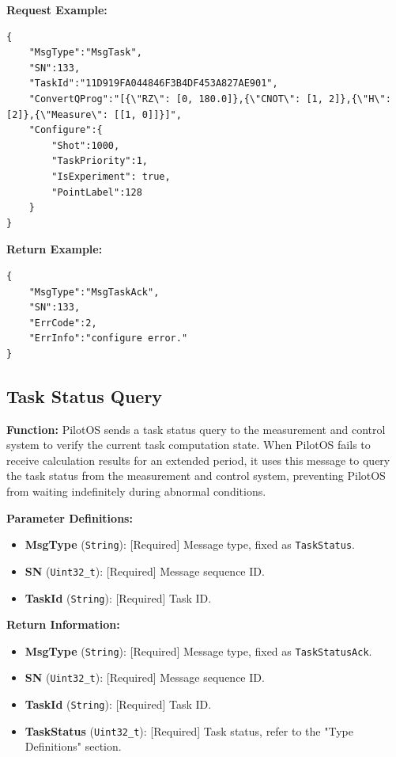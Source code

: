 \documentclass[12pt, a4paper]{article}
\begin{document}
\noindent \textbf{Request Example:}
\begin{lstlisting}
{
    "MsgType":"MsgTask",
    "SN":133,
    "TaskId":"11D919FA044846F3B4DF453A827AE901",
    "ConvertQProg":"[{\"RZ\": [0, 180.0]},{\"CNOT\": [1, 2]},{\"H\": [2]},{\"Measure\": [[1, 0]]}]",
    "Configure":{
        "Shot":1000,
        "TaskPriority":1,
        "IsExperiment": true,
        "PointLabel":128
    }
}
\end{lstlisting}

\noindent \textbf{Return Example:}
\begin{lstlisting}
{
    "MsgType":"MsgTaskAck",
    "SN":133,
    "ErrCode":2,
    "ErrInfo":"configure error."
}
\end{lstlisting}

\subsection{Task Status Query}

\textbf{Function:} PilotOS sends a task status query to the measurement and control system to verify the current task computation state. When PilotOS fails to receive calculation results for an extended period, it uses this message to query the task status from the measurement and control system, preventing PilotOS from waiting indefinitely during abnormal conditions.

\textbf{Parameter Definitions:}
\begin{itemize}
    \item \textbf{MsgType} (\texttt{String}): [Required] Message type, fixed as \texttt{TaskStatus}.
    \item \textbf{SN} (\texttt{Uint32\_t}): [Required] Message sequence ID.
    \item \textbf{TaskId} (\texttt{String}): [Required] Task ID.
\end{itemize}

\textbf{Return Information:}
\begin{itemize}
    \item \textbf{MsgType} (\texttt{String}): [Required] Message type, fixed as \texttt{TaskStatusAck}.
    \item \textbf{SN} (\texttt{Uint32\_t}): [Required] Message sequence ID.
    \item \textbf{TaskId} (\texttt{String}): [Required] Task ID.
    \item \textbf{TaskStatus} (\texttt{Uint32\_t}): [Required] Task status, refer to the "Type Definitions" section.
\end{itemize}
\end{document}
